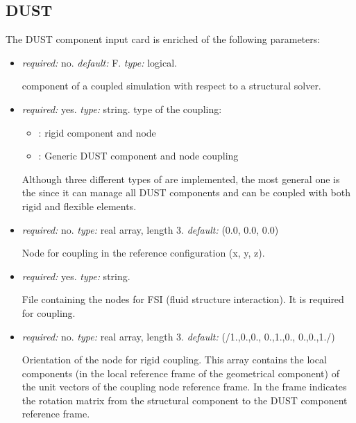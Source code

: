 \subsection{DUST}
\label{subsec:DUSTpreCICE}
The DUST component input card is enriched of the following parameters:
\begin{itemize}
    \item {} \textit{required:} no. \textit{default:} F. \textit{type:} logical.
    
    component of a coupled simulation with respect to a structural solver.
    
    \item {} \textit{required:} yes. \textit{type:} string. 
    type of the coupling:
    \begin{itemize}
        \item {}: rigid component and node 
        \item {}: Generic DUST component and node coupling
    \end{itemize}
    Although three different types of are implemented, the most general one 
    is the  since it can manage all DUST components and can be coupled with both rigid and flexible elements.  

  \item {} \textit{required:} no. \textit{type:} 
  real array, length 3. \textit{default:} (0.0, 0.0, 0.0)

    Node for  coupling in the reference configuration (x, y, z).

  \item {} \textit{required:} yes. \textit{type:} string. 

  File containing the nodes for FSI (fluid structure interaction). 
  It is required for  coupling. 

  \item {} \textit{required:} no. 
  \textit{type:} real array, length 3. \textit{default:} (/1.,0.,0., 0.,1.,0., 0.,0.,1./)

  Orientation of the node for rigid coupling. This array contains the local 
  components (in the local reference frame of the geometrical component) 
  of the unit vectors of the coupling node reference frame. In the  
  frame indicates the rotation matrix from the structural component to the 
  DUST component reference frame. 

\end{itemize}
